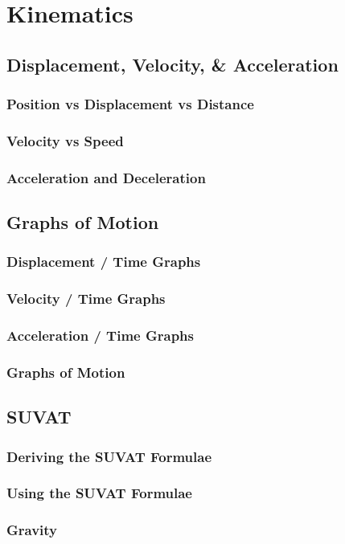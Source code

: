 \documentclass[../maths.tex]{subfiles}
\begin{document}
\chapter{Kinematics}
\section{Displacement, Velocity, \& Acceleration}
\subsection*{Position vs Displacement vs Distance}
\subsection*{Velocity vs Speed}
\subsection*{Acceleration and Deceleration}
\section{Graphs of Motion}
\subsection*{Displacement / Time Graphs}
\subsection*{Velocity / Time Graphs}
\subsection*{Acceleration / Time Graphs}
\subsection*{Graphs of Motion}
\section{SUVAT}
\subsection*{Deriving the SUVAT Formulae}
\subsection*{Using the SUVAT Formulae}
\subsection*{Gravity}
\end{document}
